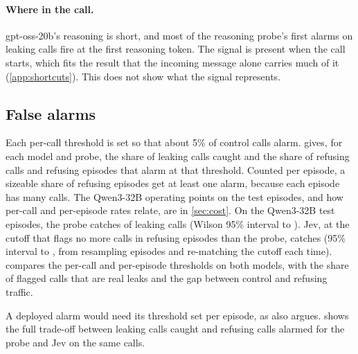 \paragraph{Where in the call.}
gpt-oss-20b's reasoning is short, and most of the reasoning probe's first alarms on leaking calls fire at the first reasoning token.
The signal is present when the call starts, which fits the result that the incoming message alone carries much of it (\cref{app:shortcuts}).
This does not show what the signal represents.

\subsection{False alarms}
\label{app:alarms}

Each per-call threshold is set so that about 5\% of control calls alarm.
 gives, for each model and probe, the share of leaking calls caught and the share of refusing calls and refusing episodes that alarm at that threshold.
Counted per episode, a sizeable share of refusing episodes get at least one alarm, because each episode has many calls.
The Qwen3-32B operating points on the test episodes, and how per-call and per-episode rates relate, are in \cref{sec:cost}.
On the Qwen3-32B test episodes, the probe catches \qwenFreshProbeCaughtWilson{} of leaking calls (Wilson 95\% interval \qwenFreshProbeCaughtWilsonLow{} to \qwenFreshProbeCaughtWilsonHigh{}).
Jev, at the cutoff that flags no more calls in refusing episodes than the probe, catches \qwenMatchedJevCaught{} (95\% interval \qwenMatchedJevCaughtLow{} to \qwenMatchedJevCaughtHigh{}, from resampling episodes and re-matching the cutoff each time).
 compares the per-call and per-episode thresholds on both models, with the share of flagged calls that are real leaks and the gap between control and refusing traffic.

\begin{table}[h]
  \centering
  \footnotesize
  \setlength{\tabcolsep}{3pt}
  
  \caption{Per-call and per-episode thresholds on the test episodes: precision of the flagged calls, leaking episodes caught by their first leak, refusing episodes and calls flagged, and the same rates on control traffic. Recruiting calls come from leaking and refusing episodes; control calls come from control episodes and are counted separately. Jev's per-call row uses the cutoff that flags no more refusing calls than the probe. Precision counts every flagged recruiting call, including calls before the leak in leaking episodes, so its denominator is not the sum of the other columns.}
  \label{tab:episode-calibration}
\end{table}
A deployed alarm would need its threshold set per episode, as \citet{gao2026} also argues.
 shows the full trade-off between leaking calls caught and refusing calls alarmed for the probe and Jev on the same calls.


